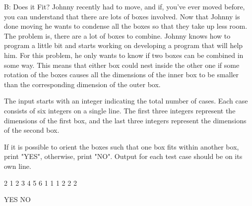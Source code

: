 \begin{problem}{B: Does it Fit?}
Johnny recently had to move, and if, you've ever moved before, you can understand that there are lots of boxes involved. Now that Johnny is done moving he wants to condense all the boxes so that they take up less room. The problem is, there are a lot of boxes to combine. Johnny knows how to program a little bit and starts working on developing a program that will help him. For this problem, he only wants to know if two boxes can be combined in some way. This means that either box could nest inside the other one if some rotation of the boxes causes all the dimensions of the inner box to be smaller than the corresponding dimension of the outer box.
\end{problem}

\begin{formalin}
The input starts with an integer indicating the total number of cases. Each case consists of six integers on a single line. The first three integers represent the dimensions of the first box, and the last three integers represent the dimensions of the second box.
\end{formalin}

\begin{formalout}
If it is possible to orient the boxes such that one box fits within another box, print "YES", otherwise, print "NO". Output for each test case should be on its own line.
\end{formalout}

\begin{datain}
2
1 2 3 4 5 6
1 1 1 2 2 2
\end{datain}

\begin{dataout}
YES
NO
\end{dataout}


